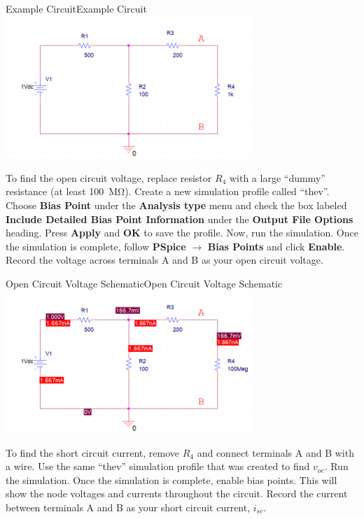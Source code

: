 \documentclass[12pt]{../manual}
\begin{document}
\begin{myfigure}[colback=white,label=fig:exampleCircuit]{Example Circuit}{Example Circuit}
\centering
\includegraphics[width=0.7\textwidth]{figures/ExampleCircuitSchematicCrop.PNG}
\end{myfigure}

To find the open circuit voltage, replace resistor $R_4$ with a large ``dummy'' resistance (at least \SI{100}{\mega\ohm}). Create a new simulation profile called ``thev''. Choose \textbf{Bias Point} under the \textbf{Analysis type} menu and check the box labeled \textbf{Include Detailed Bias Point Information} under the \textbf{Output File Options} heading. Press \textbf{Apply} and \textbf{OK} to save the profile. Now, run the simulation. Once the simulation is complete, follow \textbf{PSpice} $\to$ \textbf{Bias Points} and click \textbf{Enable}. Record the voltage across terminals A and B as your open circuit voltage.

\begin{myfigure}[colback=white,label=fig:openCircuit]{Open Circuit Voltage Schematic}{Open Circuit Voltage Schematic}
\centering
\includegraphics[width=0.7\textwidth]{figures/OpenCircuitSchematicCrop.PNG}
\end{myfigure}

To find the short circuit current, remove $R_4$ and connect terminals A and B with a wire.
Use the same ``thev'' simulation profile that was created to find $v_{oc}$. Run the simulation. Once the simulation is complete, enable bias points. This will show the node voltages and currents throughout the circuit. Record the current between terminals A and B as your short circuit current, $i_{sc}$.
\end{document}
